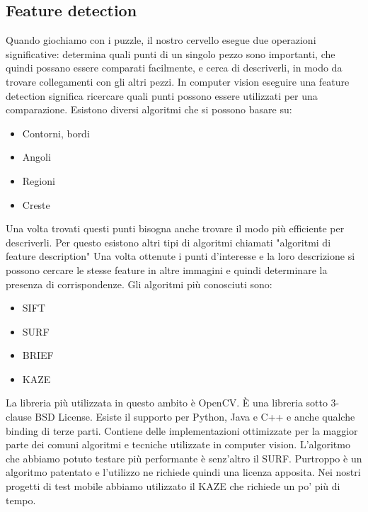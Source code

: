 \documentclass[twoside]{supsistudent}
\begin{document}
\subsection{Feature detection}%
Quando giochiamo con i puzzle, il nostro cervello esegue due operazioni significative: determina quali punti di un singolo pezzo sono importanti, che quindi possano essere comparati facilmente, e cerca di descriverli, in modo da trovare collegamenti con gli altri pezzi. In computer vision eseguire una feature detection significa ricercare quali punti possono essere utilizzati per una comparazione. Esistono diversi algoritmi che si possono basare su: \begin{itemize}
\item Contorni, bordi
\item Angoli
\item Regioni
\item Creste
\end{itemize}
Una volta trovati questi punti bisogna anche trovare il modo più efficiente per descriverli. Per questo esistono altri tipi di algoritmi chiamati "algoritmi di feature description"
Una volta ottenute i punti d'interesse e la loro descrizione si possono cercare le stesse feature in altre immagini e quindi determinare la presenza di corrispondenze. 
Gli algoritmi più conosciuti sono:
\begin{itemize}
\item SIFT
\item SURF
\item BRIEF
\item KAZE
\end{itemize}
La libreria più utilizzata in questo ambito è OpenCV. È una libreria sotto 3-clause BSD License. Esiste il supporto per Python, Java e C++ e anche qualche binding di terze parti. Contiene delle implementazioni ottimizzate per la maggior parte dei comuni algoritmi e tecniche utilizzate in computer vision.
L'algoritmo che abbiamo potuto testare più performante è senz'altro il SURF. Purtroppo è un algoritmo patentato e l'utilizzo ne richiede quindi una licenza apposita. Nei nostri progetti di test mobile abbiamo utilizzato il KAZE che richiede un po' più di tempo.
\end{document}
